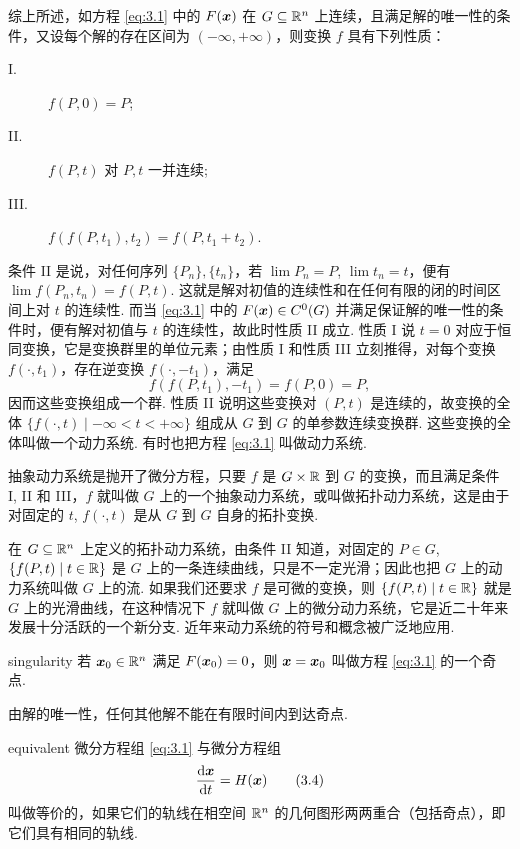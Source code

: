 综上所述，如方程 \eqref{eq:3.1} 中的 $F(\boldsymbol{x})$ 在 $G \subseteq \mathbb{R}^n$ 上连续，且满足解的唯一性的条件，又设每个解的存在区间为 $(-\infty, +\infty)$，则变换 $f$ 具有下列性质：
\begin{description}
\item[I.] $f(P, 0) = P$;
\item[II.] $f(P, t)$ 对 $P, t$ 一并连续;
\item[III.] $f(f(P, t_1), t_2) = f(P, t_1 + t_2)$.
\end{description}
条件 II 是说，对任何序列 $\{P_n\}, \{t_n\}$，若 $\lim P_n = P$, $\lim t_n = t$，便有 $\lim f(P_n, t_n) = f(P, t)$. 这就是解对初值的连续性和在任何有限的闭的时间区间上对 $t$ 的连续性. 而当 \eqref{eq:3.1} 中的 $F(\boldsymbol{x}) \in C^0(G)$ 并满足保证解的唯一性的条件时，便有解对初值与 $t$ 的连续性，故此时性质 II 成立. 性质 I 说 $t = 0$ 对应于恒同变换，它是变换群里的单位元素；由性质 I 和性质 III 立刻推得，对每个变换 $f(\cdot, t_1)$，存在逆变换 $f(\cdot, -t_1)$，满足
\[
f(f(P, t_1), -t_1) = f(P, 0) = P,
\]
因而这些变换组成一个群. 性质 II 说明这些变换对 $(P, t)$ 是连续的，故变换的全体 $\{f(\cdot, t) \mid -\infty < t < +\infty\}$ 组成从 $G$ 到 $G$ 的单参数连续变换群. 这些变换的全体叫做一个动力系统. 有时也把方程 \eqref{eq:3.1} 叫做动力系统.

抽象动力系统是抛开了微分方程，只要 $f$ 是 $G \times \mathbb{R}$ 到 $G$ 的变换，而且满足条件 I, II 和 III，$f$ 就叫做 $G$ 上的一个抽象动力系统，或叫做拓扑动力系统，这是由于对固定的 $t$, $f(\cdot, t)$ 是从 $G$ 到 $G$ 自身的拓扑变换.

在 $G \subseteq \mathbb{R}^n$ 上定义的拓扑动力系统，由条件 II 知道，对固定的 $P \in G$, $\{f(P, t) \mid t \in \mathbb{R}\}$ 是 $G$ 上的一条连续曲线，只是不一定光滑；因此也把 $G$ 上的动力系统叫做 $G$ 上的流. 如果我们还要求 $f$ 是可微的变换，则 $\{f(P, t) \mid t \in \mathbb{R}\}$ 就是 $G$ 上的光滑曲线，在这种情况下 $f$ 就叫做 $G$ 上的微分动力系统，它是近二十年来发展十分活跃的一个新分支. 近年来动力系统的符号和概念被广泛地应用.

\begin{definition}{}{singularity}
若 $\boldsymbol{x}_0 \in \mathbb{R}^n$ 满足 $F(\boldsymbol{x}_0) = 0$，则 $\boldsymbol{x} = \boldsymbol{x}_0$ 叫做方程 \eqref{eq:3.1} 的一个奇点.
\end{definition}

由解的唯一性，任何其他解不能在有限时间内到达奇点.

\begin{definition}{}{equivalent}
微分方程组 \eqref{eq:3.1} 与微分方程组
\[
\frac{\mathrm{d} \boldsymbol{x}}{\mathrm{d} t} = H(\boldsymbol{x}) \tag{3.4}\label{eq:3.4}
\]
叫做等价的，如果它们的轨线在相空间 $\mathbb{R}^n$ 的几何图形两两重合（包括奇点），即它们具有相同的轨线.
\end{definition}

